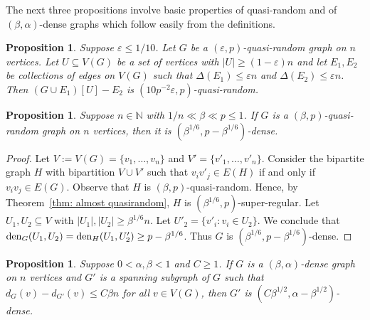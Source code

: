 \documentclass[a4paper, 11pt, reqno]{amsart}
\newtheorem{proposition}[definition]{Proposition}
\numberwithin{equation}{section}
\newcommand{\1}{{\rm 1\hspace*{-0.4ex}%
\rule{0.1ex}{1.52ex}\hspace*{0.2ex}}}
\newcommand{\den}{{\rm den}}
\renewcommand{\epsilon}{\varepsilon}
\newcommand{\sub}{\subseteq}
\newcommand{\COMMENT}[1]{}
\begin{document}
The next three propositions involve basic properties of quasi-random and of $(\beta,\alpha)$-dense graphs which follow easily from the definitions.
\begin{proposition}\label{prop: quasi-random subgraph}
Suppose $\epsilon \leq 1/10$. Let $G$ be a $(\epsilon,p)$-quasi-random graph on $n$ vertices. 
Let $U \sub V(G)$ be a set of vertices with $|U|\geq (1-\epsilon) n$ and 
let $E_1,E_2$ be collections of edges on $V(G)$ such that $\Delta(E_1)\leq \epsilon n$ and $\Delta(E_2)\leq \epsilon n$. 
Then $(G\cup E_1)[U] -E_2$ is $(10p^{-2}\epsilon,p)$-quasi-random.
\end{proposition}
\COMMENT{\begin{proof}
Let $G':= (G\cup E_1)[U]-E_2$.
For $u,v \in V(G')$, 
we have $d_{G'}(u,v) = d_{G}(u,v) \pm (\epsilon n + 2\Delta(E_1)+ 2\Delta(E_2)) = d_{G}(u,v) \pm 5\epsilon n = (1\pm 10 p^{-2}\epsilon)p^2 |U|$.\COMMENT{ $(1\pm 6 p^{-2}\epsilon)p^2 n = (1\pm 6 p^{-2}\epsilon)p^2|U|/(1\pm \epsilon) = (1\pm 10 p^{-2}\epsilon)p^2 |U|$}
In a similar way, $d_{G'}(u)= d_{G}(u)\pm 3\epsilon n = (1\pm 10p^{-1}\epsilon)p |U|$. Thus $G'$ is $(10p^{-2}\epsilon,p)$-quasi-random.
\end{proof}}

\begin{proposition}\label{prop: quasi-random implies dense}
Suppose $n\in \mathbb{N}$ with $1/n\ll \beta\ll p \leq 1$. If $G$ is a $(\beta,p)$-quasi-random graph on $n$ vertices, then it is 
$(\beta^{1/6},p-\beta^{1/6})$-dense.
\end{proposition}
\begin{proof}
Let $V:=V(G)=\{v_1,\dots, v_n\}$ and $V'=\{v'_1,\dots, v'_n\}$. 
Consider the bipartite graph $H$ with bipartition $V\cup V'$ such that $v_iv'_j \in E(H)$ if and only if $v_iv_j \in E(G)$.
Observe that $H$ is $(\beta,p)$-quasi-random. Hence, by Theorem~\ref{thm: almost quasirandom}, $H$ is $(\beta^{1/6},p)$-super-regular.
Let $U_1, U_2\subseteq V$ with $|U_1|,|U_2|\geq \beta^{1/6}n$. 
Let $U'_2=\{v'_i: v_i\in U_2\}$.
We conclude that $\den_G(U_1,U_2)= \den_H(U_1,U'_2) \geq p- \beta^{1/6}$.
Thus $G$ is $(\beta^{1/6},p-\beta^{1/6})$-dense.
\end{proof}

\begin{proposition}\label{prop: dense deletion}
Suppose $0< \alpha,\beta < 1$ and $C\geq 1$. 
If $G$ is a $(\beta,\alpha)$-dense graph on $n$ vertices and $G'$ is a spanning subgraph of $G$ such that $d_{G}(v)- d_{G'}(v) \leq C \beta n$ for all $v\in V(G)$, 
then $G'$ is $(C\beta^{1/2},\alpha-\beta^{1/2})$-dense. 
\end{proposition}
\COMMENT{
\begin{proof}
For any two sets $U,U'\subseteq V(G)$ with $|U|,|U'|\geq C \beta^{1/2} n$, 
we obtain $$\den_{G'}(U,U') 
\geq \frac{e_{G}(U,U') - C\beta n|U|}{|U||U'|} 
\geq \alpha  - \frac{C\beta n}{|U'|} 
\geq \alpha - \beta^{1/2},$$ 
which shows that $G'$ is $(C\beta^{1/2},\alpha-\beta^{1/2})$-dense. 
\end{proof}
}
\end{document}
